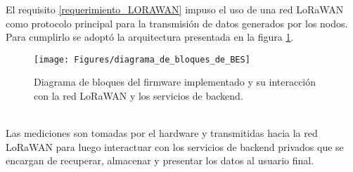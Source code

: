 El requisito \ref{requerimiento_LORAWAN} impuso el uso de una red LoRaWAN como protocolo principal para la transmisión de datos generados por los nodos. Para cumplirlo se adoptó la arquitectura presentada en la figura \ref{fig:diagramadebloquesdebes}.\\
\begin{figure}[h!]
	\centering
	\texttt{[image: Figures/diagrama\_de\_bloques\_de\_BES]}
	\caption{Diagrama de bloques del firmware implementado y su interacción con la red LoRaWAN y los servicios de backend.}
	\label{fig:diagramadebloquesdebes}
\end{figure}\\
Las mediciones son tomadas por el hardware y transmitidas hacia la red LoRaWAN para luego interactuar con los servicios de backend privados que se encargan de recuperar, almacenar y presentar los datos al usuario final.\\

